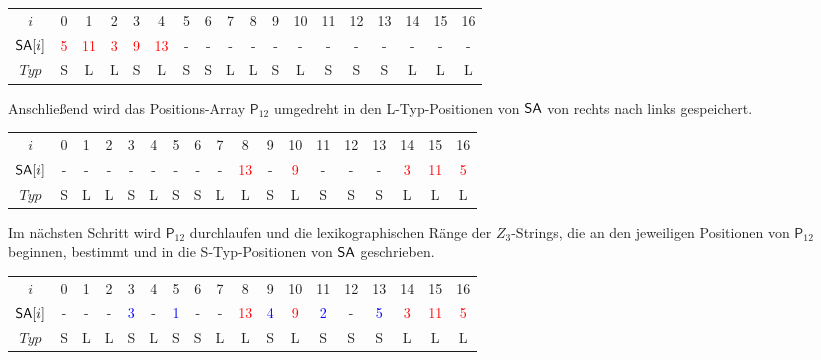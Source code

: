 \begin{table}[H]
	\footnotesize
	\centering
	\begin{tabular}{c| c c c c c c c c c c c c c c c c c}
		$i$ & 0 & 1 & 2 & 3 & 4 & 5 & 6 & 7 & 8 & 9 & 10 & 11 & 12 & 13 & 14 & 15 & 16 \\
		$\sa[i]$ & \textcolor{red}{5} & \textcolor{red}{11} & \textcolor{red}{3} & \textcolor{red}{9} & \textcolor{red}{13} & - & - & - & - & - & - & - & - & - & - & - & - \\
		$Typ$ & S & L & L & S & L & S & S & L & L & S & L & S & S & S & L & L & L
	\end{tabular}
\end{table}

Anschließend wird das Positions-Array $\mathsf{P}_{12}$ umgedreht in den L-Typ-Positionen von $\sa$ von rechts nach links gespeichert.

\begin{table}[H]
	\footnotesize
	\centering
	\begin{tabular}{c| c c c c c c c c c c c c c c c c c}
		$i$ & 0 & 1 & 2 & 3 & 4 & 5 & 6 & 7 & 8 & 9 & 10 & 11 & 12 & 13 & 14 & 15 & 16 \\
		$\sa[i]$ & - & - & - & - & - & - & - & - & \textcolor{red}{13} & - & \textcolor{red}{9} & - & - & - & \textcolor{red}{3} & \textcolor{red}{11} & \textcolor{red}{5} \\
		$Typ$ & S & L & L & S & L & S & S & L & L & S & L & S & S & S & L & L & L
	\end{tabular}
\end{table}

Im nächsten Schritt wird $\mathsf{P}_{12}$ durchlaufen und die lexikographischen Ränge der $Z_3$-Strings, die an den jeweiligen Positionen von $\mathsf{P}_{12}$ beginnen, bestimmt und in die S-Typ-Positionen von $\sa$ geschrieben.

\begin{table}[H]
	\footnotesize
	\centering
	\begin{tabular}{c| c c c c c c c c c c c c c c c c c}
		$i$ & 0 & 1 & 2 & 3 & 4 & 5 & 6 & 7 & 8 & 9 & 10 & 11 & 12 & 13 & 14 & 15 & 16 \\
		$\sa[i]$ & - & - & - & \textcolor{blue}{3} & - & \textcolor{blue}{1} & - & - & \textcolor{red}{13} & \textcolor{blue}{4} & \textcolor{red}{9} & \textcolor{blue}{2} & - & \textcolor{blue}{5} & \textcolor{red}{3} & \textcolor{red}{11} & \textcolor{red}{5} \\
		$Typ$ & S & L & L & S & L & S & S & L & L & S & L & S & S & S & L & L & L
	\end{tabular}
\end{table}

